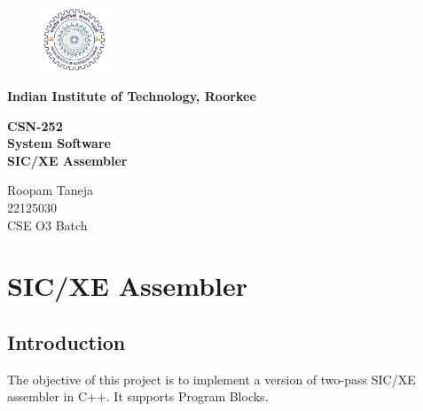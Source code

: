 \documentclass[
]{article}
\begin{document}
\begin{titlepage}
    \begin{center}
    \vspace*{1cm}
        \begin{figure}
            \centering
            \includegraphics[width=0.17\textwidth]{img/iitr_logo.png}
        \end{figure}
        
        {\LARGE\textbf{Indian Institute of Technology, Roorkee}}\\
        
        \vspace{0.4cm}
        
        {\LARGE\textbf{CSN-252}}\\
        \vspace{0.4cm}
        {\LARGE\textbf{System Software}}\\
        
        \vspace{4cm}
        {\Huge\textbf{SIC/XE Assembler}}

        \vfill
        
        \LARGE{Roopam Taneja}\\
        \LARGE{22125030}\\
        \LARGE{CSE O3 Batch}\\
        
        
        \vspace{2cm}
        
    \end{center}
\end{titlepage}

\section{SIC/XE Assembler}\label{csn-252-project}
\vspace{0.5cm}
\subsection{Introduction}\label{introduction}

The objective of this project is to implement a version of two-pass
SIC/XE assembler in C++. It supports Program Blocks.
\end{document}
